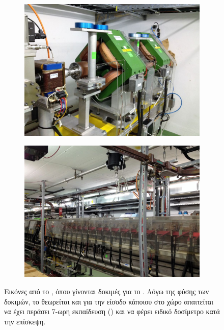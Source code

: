 \begin{figure}[tph]
\begin{subfigure}{0.47\linewidth}
		\includegraphics[width=\linewidth]{images/CLIC-CTF3-img3}
    \end{subfigure}        
	\hfill
    \begin{subfigure}{0.47\linewidth}
		\centering
		\includegraphics[width=\linewidth]{images/CLIC-CTF3-img4}
    \end{subfigure}
\caption[Εικόνες από το .]
{Εικόνες από το , όπου γίνονται δοκιμές για το . 
Λόγω της φύσης των δοκιμών, το  θεωρείται  και για την είσοδο κάποιου στο χώρο απαιτείται να έχει περάσει 7-ωρη εκπαίδευση () και να φέρει ειδικό δοσίμετρο κατά την επίσκεψη.}
\label{img:CLIC-CTF3}        
\end{figure}

